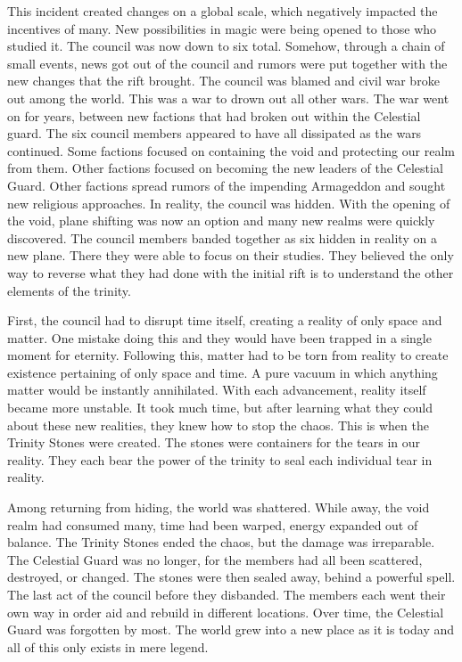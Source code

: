 This incident created changes on a global scale, which negatively impacted the incentives of many. New possibilities in magic were being opened to those who studied it. The council was now down to six total. Somehow, through a chain of small events, news got out of the council and rumors were put together with the new changes that the rift brought. The council was blamed and civil war broke out among the world. This was a war to drown out all other wars. The war went on for years, between new factions that had broken out within the Celestial guard. The six council members appeared to have all dissipated as the wars continued. Some factions focused on containing the void and protecting our realm from them. Other factions focused on becoming the new leaders of the Celestial Guard. Other factions spread rumors of the impending Armageddon and sought new religious approaches. In reality, the council was hidden. With the opening of the void, plane shifting was now an option and many new realms were quickly discovered. The council members banded together as six hidden in reality on a new plane. There they were able to focus on their studies. They believed the only way to reverse what they had done with the initial rift is to understand the other elements of the trinity. 

First, the council had to disrupt time itself, creating a reality of only space and matter. One mistake doing this and they would have been trapped in a single moment for eternity. Following this, matter had to be torn from reality to create existence pertaining of only space and time. A pure vacuum in which anything matter would be instantly annihilated. With each advancement, reality itself became more unstable. It took much time, but after learning what they could about these new realities, they knew how to stop the chaos. This is when the Trinity Stones were created. The stones were containers for the tears in our reality. They each bear the power of the trinity to seal each individual tear in reality.

Among returning from hiding, the world was shattered. While away, the void realm had consumed many, time had been warped, energy expanded out of balance. The Trinity Stones ended the chaos, but the damage was irreparable. The Celestial Guard was no longer, for the members had all been scattered, destroyed, or changed. The stones were then sealed away, behind a powerful spell. The last act of the council before they disbanded. The members each went their own way in order aid and rebuild in different locations. Over time, the Celestial Guard was forgotten by most. The world grew into a new place as it is today and all of this only exists in mere legend.  

